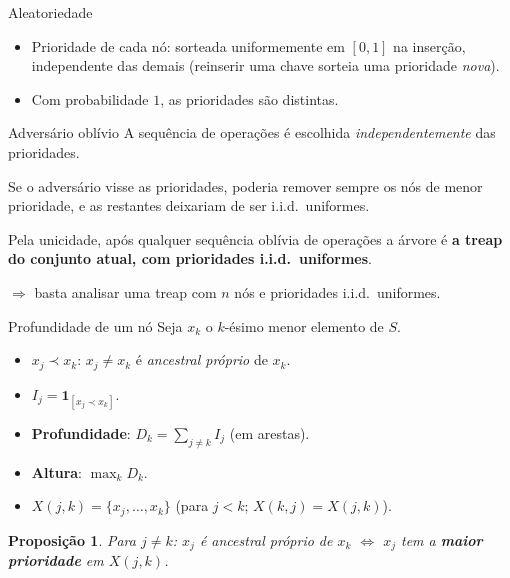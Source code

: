 \documentclass[aspectratio=169,11pt]{beamer}
\newcommand{\Ind}[1]{\mathbf{1}_{#1}}
\newtheorem{proposicao}[theorem]{Proposição}
\theoremstyle{definition}
\begin{document}
\begin{frame}{Aleatoriedade}
  \begin{itemize}
  \item Prioridade de cada nó: sorteada uniformemente em $[0,1]$ na
    inserção, independente das demais (reinserir uma chave sorteia
    uma prioridade \emph{nova}).
  \item Com probabilidade $1$, as prioridades são distintas.
  \end{itemize}
  \pause
  \begin{alertblock}{Adversário oblívio}
    A sequência de operações é escolhida \emph{independentemente} das
    prioridades.

    Se o adversário visse as prioridades, poderia remover sempre os nós
    de menor prioridade, e as restantes deixariam de ser i.i.d.\
    uniformes.
  \end{alertblock}
  \pause
  Pela unicidade, após qualquer sequência oblívia de operações a
  árvore é \textbf{a treap do conjunto atual, com prioridades i.i.d.\
    uniformes}.

  $\Rightarrow$ basta analisar uma treap com $n$ nós e prioridades
  i.i.d.\ uniformes.
\end{frame}

\begin{frame}{Profundidade de um nó}
  Seja $x_k$ o $k$-ésimo menor elemento de $S$.
  \begin{itemize}
  \item $x_j\prec x_k$: $x_j\neq x_k$ é \emph{ancestral próprio} de
    $x_k$.
  \item $I_j=\Ind{[x_j\prec x_k]}$.
  \item \textbf{Profundidade}: $D_k=\sum_{j\neq k}I_j$ (em arestas).
  \item \textbf{Altura}: $\max_k D_k$.
  \item $X(j,k)=\{x_j,\dots,x_k\}$ (para $j<k$; $X(k,j)=X(j,k)$).
  \end{itemize}
  \pause
  \begin{proposicao}
    Para $j\neq k$: $x_j$ é ancestral próprio de $x_k$ $\iff$ $x_j$
    tem a \textbf{maior prioridade} em $X(j,k)$.
  \end{proposicao}
\end{frame}
\end{document}
